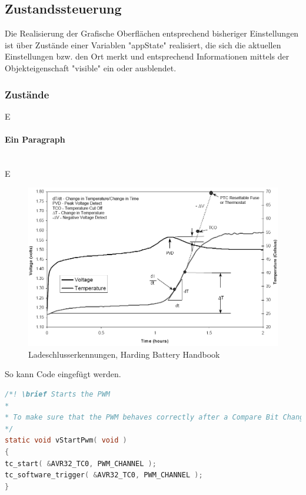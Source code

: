 \subsection{Zustandssteuerung}
Die Realisierung der Grafische Oberflächen entsprechend bisheriger Einstellungen ist über Zustände einer Variablen "appState" realisiert, die sich die aktuellen Einstellungen bzw. den Ort merkt und entsprechend Informationen mittels der Objekteigenschaft "visible" ein oder ausblendet.
\subsubsection{Zustände}
E
\paragraph{Ein Paragraph}$\;$\\
E

\begin{figure}[ht!]
	\centering
	\includegraphics[angle=0,width=14cm]{LatexBeispiel/Bilder/Ladeschlussbw.png}
	\caption{Ladeschlusserkennungen, Harding Battery Handbook\cite{Harding}}
	\label{Ladeschluss}
\end{figure}

\newpage
So kann Code eingefügt werden.
\begin{lstlisting}[frame=single,breaklines=true,basicstyle=\tiny,language=C,label={PWMStart},caption={Kommentierter Start der PWM}]
/*! \brief Starts the PWM
* 
* To make sure that the PWM behaves correctly after a Compare Bit Change the PWM is started and reset with a software trigger.
*/
static void vStartPwm( void )
{
tc_start( &AVR32_TC0, PWM_CHANNEL );
tc_software_trigger( &AVR32_TC0, PWM_CHANNEL );
}
\end{lstlisting}

